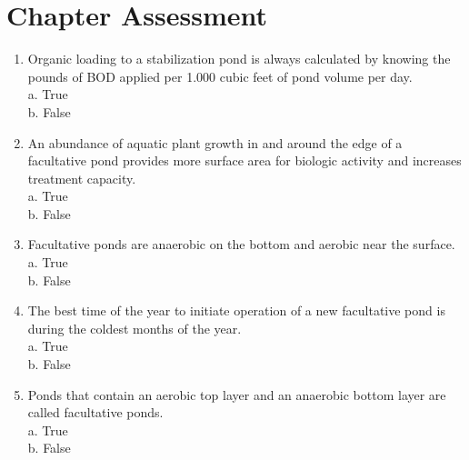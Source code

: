 \section*{Chapter Assessment}
\begin{tcolorbox}[breakable, enhanced,
colframe=blue!25,
colback=blue!10,
coltitle=blue!20!black,  
title= Chapter Assessment]

\begin{enumerate}

\item  Organic loading to a stabilization pond is always calculated by knowing the pounds of BOD applied per 1.000 cubic feet of pond volume per day.\\


a. True \\

b. False \\


\item  An abundance of aquatic plant growth in and around the edge of a facultative pond provides more surface area for biologic activity and increases treatment capacity.\\


a. True \\

b. False \\


\item  Facultative ponds are anaerobic on the bottom and aerobic near the surface.\\


a. True \\

b. False \\


\item  The best time of the year to initiate operation of a new facultative pond is during the coldest months of the year.\\


a. True \\

b. False \\


\item  Ponds that contain an aerobic top layer and an anaerobic bottom layer are called facultative ponds.\\


a. True \\

b. False \\



\end{enumerate}
\end{tcolorbox}
